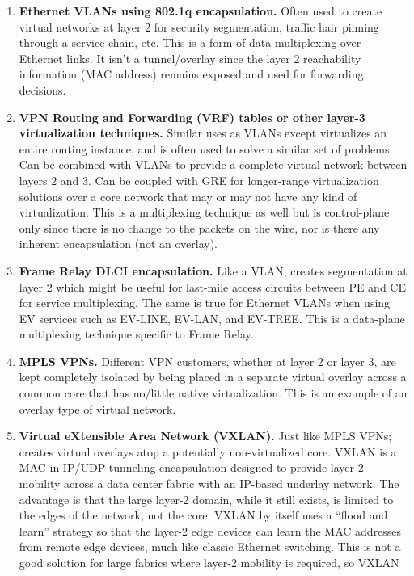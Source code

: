 \begin{enumerate}
  \item \textbf{Ethernet VLANs using 802.1q encapsulation.} Often used to create
  virtual networks at layer 2 for security segmentation, traffic hair pinning
  through a service chain, etc. This is a form of data multiplexing over
  Ethernet links. It isn’t a tunnel/overlay since the layer 2 reachability
  information (MAC address) remains exposed and used for forwarding decisions.
  \item \textbf{VPN Routing and Forwarding (VRF) tables or other layer-3
  virtualization techniques.} Similar uses as VLANs except virtualizes an
  entire routing instance, and is often used to solve a similar set of
  problems. Can be combined with VLANs to provide a complete virtual network
  between layers 2 and 3. Can be coupled with GRE for longer-range
  virtualization solutions over a core network that may or may not have any
  kind of virtualization. This is a multiplexing technique as well but is
  control-plane only since there is no change to the packets on the wire, nor
  is there any inherent encapsulation (not an overlay).
  \item \textbf{Frame Relay DLCI encapsulation.} Like a VLAN, creates segmentation
  at layer 2 which might be useful for last-mile access circuits between PE and
  CE for service multiplexing. The same is true for Ethernet VLANs when using
  EV services such as EV-LINE, EV-LAN, and EV-TREE\@. This is a data-plane
  multiplexing technique specific to Frame Relay.
  \item \textbf{MPLS VPNs.} Different VPN customers, whether at layer 2 or layer 3,
  are kept completely isolated by being placed in a separate virtual overlay
  across a common core that has no/little native virtualization. This is an
  example of an overlay type of virtual network.
  \item \textbf{Virtual eXtensible Area Network (VXLAN).} Just like MPLS VPNs;
  creates virtual overlays atop a potentially non-virtualized core. VXLAN is a
  MAC-in-IP/UDP tunneling encapsulation designed to provide layer-2 mobility
  across a data center fabric with an IP-based underlay network. The advantage
  is that the large layer-2 domain, while it still exists, is limited to the
  edges of the network, not the core. VXLAN by itself uses a ``flood and learn''
  strategy so that the layer-2 edge devices can learn the MAC addresses from
  remote edge devices, much like classic Ethernet switching. This is not a
  good solution for large fabrics where layer-2 mobility is required, so VXLAN

\end{enumerate}
